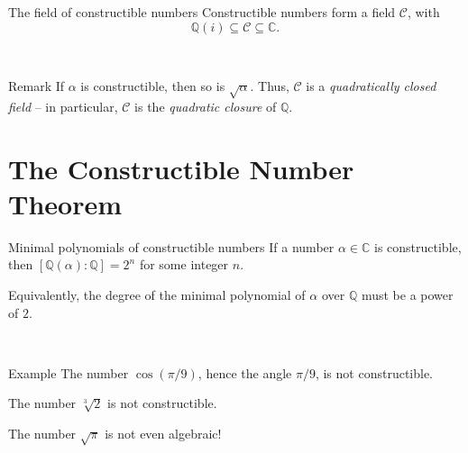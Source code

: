 \documentclass[handout]{beamer}
\def\C{\mathbb{C}}
\def\Q{\mathbb{Q}}
\begin{document}


    \begin{frame}{The field of constructible numbers}
        Constructible numbers form a field $\mathscr{C}$, with \[
            \Q(i) \subseteq \mathscr{C} \subseteq \C.
        \]

        ~\\\pause

        \begin{block}{Remark} \vspace{0.1em}
            If $\alpha$ is constructible, then so is $\sqrt{\alpha}$.
            Thus, $\mathscr{C}$ is a \emph{quadratically closed field} -- in
            particular, $\mathscr{C}$ is the \emph{quadratic closure} of $\Q$.
        \end{block}
    \end{frame}



    \section{The Constructible Number Theorem}

    \begin{frame}{Minimal polynomials of constructible numbers}
        If a number $\alpha \in \C$ is constructible, then $[\Q(\alpha) : \Q] = 2^n$
        for some integer $n$.

        Equivalently, the degree of the minimal polynomial of $\alpha$ over $\Q$ must
        be a power of $2$.

        ~\\\pause

        \begin{exampleblock}{Example} \vspace{0.1em}
            The number $\cos(\pi/9)$, hence the angle $\pi / 9$, is not
            constructible.

            The number $\sqrt[3]{2}$ is not constructible.

            The number $\sqrt{\pi}$ is not even algebraic!
        \end{exampleblock}
    \end{frame}
\end{document}
